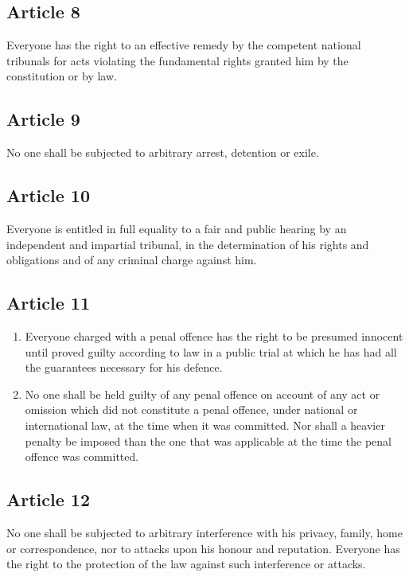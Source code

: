\documentclass[
  titlepage,
  openright,
  DIV=calc,
  toc=listof,
  listof=nochaptergap]{scrbook}
\begin{document}
\subsection{Article 8}\label{article-8-1}

Everyone has the right to an effective remedy by the competent national
tribunals for acts violating the fundamental rights granted him by the
constitution or by law.

\subsection{Article 9}\label{article-9-1}

No one shall be subjected to arbitrary arrest, detention or exile.

\subsection{Article 10}\label{article-10-1}

Everyone is entitled in full equality to a fair and public hearing by an
independent and impartial tribunal, in the determination of his rights
and obligations and of any criminal charge against him.

\subsection{Article 11}\label{article-11-1}

\begin{enumerate}
\def\labelenumi{\arabic{enumi}.}
\item
  Everyone charged with a penal offence has the right to be presumed
  innocent until proved guilty according to law in a public trial at
  which he has had all the guarantees necessary for his defence.
\item
  No one shall be held guilty of any penal offence on account of any act
  or omission which did not constitute a penal offence, under national
  or international law, at the time when it was committed. Nor shall a
  heavier penalty be imposed than the one that was applicable at the
  time the penal offence was committed.
\end{enumerate}

\subsection{Article 12}\label{article-12-1}

No one shall be subjected to arbitrary interference with his privacy,
family, home or correspondence, nor to attacks upon his honour and
reputation. Everyone has the right to the protection of the law against
such interference or attacks.
\end{document}

